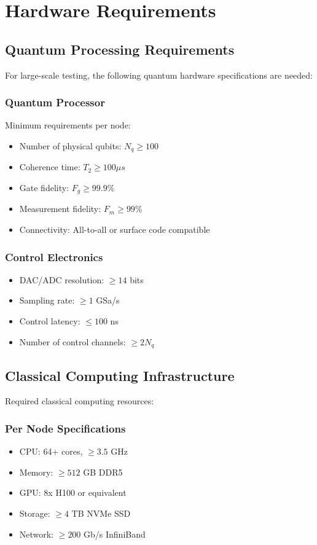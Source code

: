\documentclass{article}
\begin{document}
\section{Hardware Requirements}

\subsection{Quantum Processing Requirements}
For large-scale testing, the following quantum hardware specifications are needed:

\subsubsection{Quantum Processor}
Minimum requirements per node:
\begin{itemize}
\item Number of physical qubits: $N_q \geq 100$
\item Coherence time: $T_2 \geq 100\mu s$
\item Gate fidelity: $F_g \geq 99.9\%$
\item Measurement fidelity: $F_m \geq 99\%$
\item Connectivity: All-to-all or surface code compatible
\end{itemize}

\subsubsection{Control Electronics}
\begin{itemize}
\item DAC/ADC resolution: $\geq 14$ bits
\item Sampling rate: $\geq 1$ GSa/s
\item Control latency: $\leq 100$ ns
\item Number of control channels: $\geq 2N_q$
\end{itemize}

\subsection{Classical Computing Infrastructure}
Required classical computing resources:

\subsubsection{Per Node Specifications}
\begin{itemize}
\item CPU: 64+ cores, $\geq 3.5$ GHz
\item Memory: $\geq 512$ GB DDR5
\item GPU: 8x H100 or equivalent
\item Storage: $\geq 4$ TB NVMe SSD
\item Network: $\geq 200$ Gb/s InfiniBand
\end{itemize}
\end{document}
